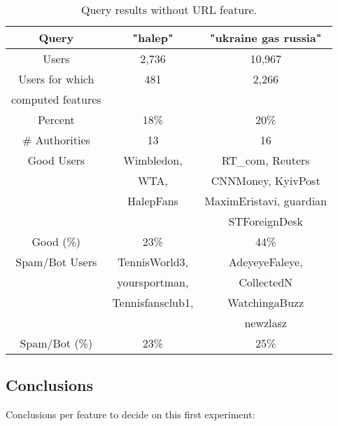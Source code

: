 \begin{table}[!h]
\centering
\setlength{\tabcolsep}{12pt}
\begin{tabular}{| c | c | c |}
\hline
Query & "halep" & "ukraine gas russia" \\
\hline
Users & 2,736 & 10,967 \\
\hline
Users for which & 481 & 2,266 \\
computed features & & \\
\hline
Percent & 18\% & 20\% \\
\hline
\# Authorities & 13 & 16\\
\hline
Good Users & Wimbledon,    		  & RT\_com, Reuters \\
		   & WTA,                 & CNNMoney, KyivPost \\
           & HalepFans            & MaximEristavi, guardian \\
           &					  & STForeignDesk \\
\hline
Good (\%) & 23\% & 44\% \\
\hline
Spam/Bot Users & TennisWorld3, 					& AdeyeyeFaleye, \\
               & yoursportman,					& CollectedN\\
               & Tennisfansclub1,		   		& WatchingaBuzz \\
               &								& newzlasz \\

\hline
Spam/Bot (\%) & 23\% & 25\% \\
\hline
\end{tabular}
\caption{Query results without URL feature.}
\label{table:res2}
\end{table}

\subsection{Conclusions}

Conclusions per feature to decide on this first experiment:

